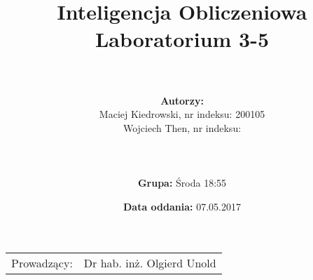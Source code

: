 \documentclass{article}
\title{Inteligencja Obliczeniowa\\
	\vspace{5mm}
	\textbf{Laboratorium 3-5}
}
\author{\\
	\\\textbf{Autorzy:}
	\\Maciej Kiedrowski, nr indeksu: 200105
	\\Wojciech Then, nr indeksu: 
	\\\\
	\\
	\\\textbf{Grupa:} Środa 18:55}
\date{\textbf{Data oddania:} 07.05.2017}
\begin{document}
	
	\maketitle %
	
	\begin{center}
		\begin{tabular}{l r}
			Prowadzący: & Dr hab. inż. Olgierd Unold 
			
		\end{tabular}
	\end{center}
	
	
	\newpage
	\tableofcontents 	%
	\newpage
	
	
	\newpage
	
	\newpage
	
%	
%	
%	
%	

	
	
	
	
	
\end{document}
